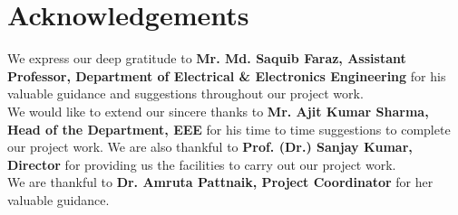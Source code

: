 \chapter*{\centering Acknowledgements}
We express our deep gratitude to \textbf{Mr. Md. Saquib Faraz, Assistant Professor, Department of Electrical \& Electronics Engineering} for his valuable guidance and suggestions throughout our project work.\\
We would like to extend our sincere thanks to \textbf{Mr. Ajit Kumar Sharma, Head of the Department, EEE} for his time to time suggestions to complete our project work. We are also thankful to \textbf{Prof. (Dr.) Sanjay Kumar, Director} for providing us the facilities to carry out our project work.\\
We are thankful to  \textbf{Dr. Amruta Pattnaik, Project Coordinator} for her valuable guidance.\\[2.5\baselineskip]
\begin{multicols}{4}
{\normalsize
{}
}
\end{multicols}
\renewcommand*\contentsname{TABLE OF CONTENTS}
\renewcommand*\listfigurename{LIST OF FIGURES} 
\renewcommand*\listtablename{LIST OF TABLES} 
\thispagestyle{empty}
\newpage
\tableofcontents
\newpage
\listoffigures
\newpage
\listoftables

\newpage
